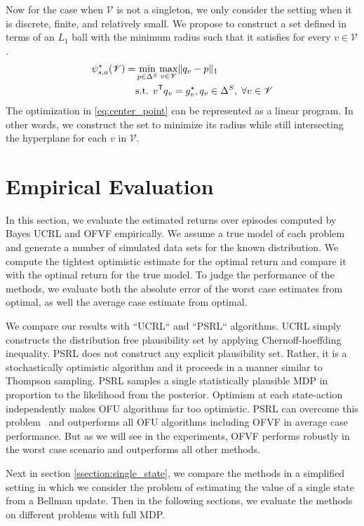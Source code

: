 \documentclass{article}
\DeclarePairedDelimiter{\norm}{\lVert}{\rVert}
\newcommand{\opt}{^\star}
\newcommand{\tr}{^{\mathsf{T}}}
\newcommand{\vset}{\mathcal{V}}
\theoremstyle{plain}
\theoremstyle{definition}
\begin{document}
Now for the case when $\mathcal{V}$ is not a singleton, we only consider the setting when it is discrete, finite, and relatively small. We propose to construct a set defined in terms of an $L_1$ ball with the minimum radius such that it satisfies for every $v\in\mathcal{V}$.
\begin{equation} \label{eq:center_point}
\begin{split}
\psi_{s,a}\opt(\mathcal{V}) = & \min_{p\in\Delta^S} \max_{v\in\vset} \norm{q_v - p}_1 \\
& \text{s.t. } v\tr  q_v = g_{v}\opt, q_v \in \Delta^S, \; \forall v \in\vset
\end{split}
\end{equation}
The optimization in \eqref{eq:center_point} can be represented as a linear program. In other words, we construct the set to minimize its radius while still intersecting the hyperplane for each $v$ in $\vset$.

\section{Empirical Evaluation} \label{sec:experiments}

In this section, we evaluate the estimated returns over episodes computed by Bayes UCRL and OFVF empirically. We assume a true model of each problem and generate a number of simulated data sets for the known distribution. We compute the tightest optimistic estimate for the optimal return and compare it with the optimal return for the true model. To judge the performance of the methods, we evaluate both the absolute error of the worst case estimates from optimal, as well the average case estimate from optimal.

We compare our results with ``UCRL`` and ``PSRL`` algorithms. UCRL simply constructs the distribution free plausibility set by applying Chernoff-hoeffding inequality. PSRL does not construct any explicit plausibility set. Rather, it is a stochastically optimistic algorithm and it proceeds in a manner similar to Thompson sampling. PSRL samples a single statistically plausible MDP in proportion to the likelihood from the posterior. Optimism at each state-action independently makes OFU algorithms far too optimistic. PSRL can overcome this problem~\cite{Osband2016} and outperforms all OFU algorithms including OFVF in average case performance. But as we will see in the experiments, OFVF performs robustly in the worst case scenario and outperforms all other methods.

Next in section \cref{ssection:single_state}, we compare the methods in a simplified setting in which we consider the problem of estimating the value of a single state from a Bellman update. Then in the following sections, we evaluate the methods on different problems with full MDP.
\end{document}
